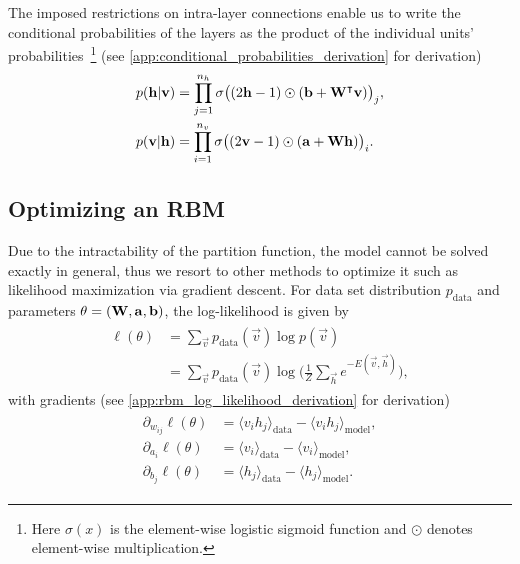 The imposed restrictions on intra-layer connections enable us to write the conditional probabilities of the layers as the product of the individual units' probabilities~\footnote{Here \( \sigma(x) \) is the element-wise logistic sigmoid function and \( \odot \) denotes element-wise multiplication.} (see \cref{app:conditional_probabilities_derivation} for derivation)
\begin{align}
\begin{split}
    p(\mathbf{h} | \mathbf{v})
        &= \prod_{j=1}^{n_h} \sigma\big( (2\mathbf{h} - 1) \odot (\mathbf{b} + \mathbf{W}^\intercal\mathbf{v}) \big)_j, \\
    p(\mathbf{v} | \mathbf{h})
        &= \prod_{i=1}^{n_v} \sigma\big( (2\mathbf{v} - 1) \odot (\mathbf{a} + \mathbf{W}\mathbf{h}) \big)_i.
\end{split}
\end{align}

\subsection{Optimizing an RBM}
Due to the intractability of the partition function, the model cannot be solved exactly in general, thus we resort to other methods to optimize it such as likelihood maximization via gradient descent.
For data set distribution \( p_\text{data} \) and parameters \( \theta = (\mathbf{W}, \mathbf{a}, \mathbf{b}) \), the log-likelihood is given by
\begin{align}
\begin{split}
    \ell(\theta)
        &= \sum_{\vec{v}} p_{\text{data}}(\vec{v}) \log p(\vec{v}) \\
        &= \sum_{\vec{v}} p_{\text{data}}(\vec{v}) \log \bigg(\frac{1}{Z} \sum_\vec{h} e^{-E(\vec{v},\vec{h})}\bigg),
\end{split}
\end{align}
with gradients (see \cref{app:rbm_log_likelihood_derivation} for derivation)
\begin{align}
\begin{split}
    \partial_{w_{ij}} \ell(\theta)
        &= \langle v_i h_j \rangle_{\text{data}} - \langle v_i h_j \rangle_{\text{model}}, \\
    \partial_{a_i} \ell(\theta)
        &= \langle v_i \rangle_{\text{data}} - \langle v_i \rangle_{\text{model}}, \\
    \partial_{b_j} \ell(\theta)
        &= \langle h_j \rangle_{\text{data}} - \langle h_j \rangle_{\text{model}}.
\end{split}
\end{align}


